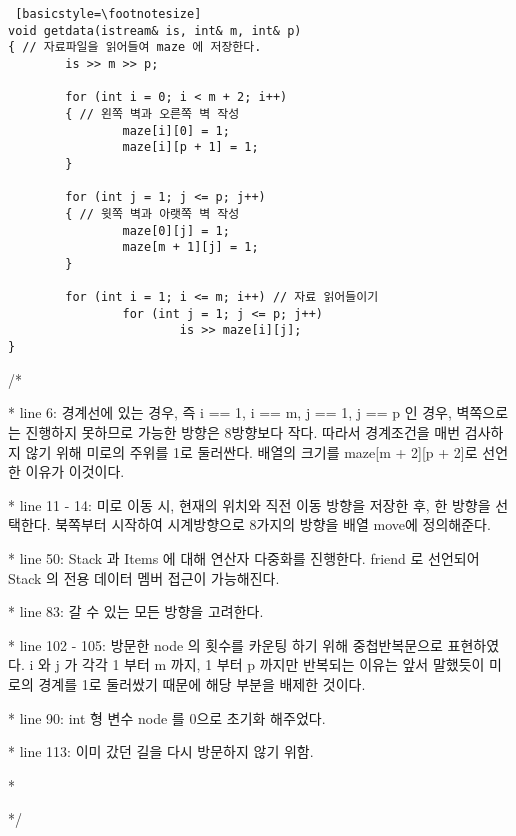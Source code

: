 \documentclass[twoside,twocolumn]{article}
\newenvironment{itemizeReduced}{
\begin{list}{\labelitemi}{\leftmargin=1em}
\setlength{\itemsep}{1pt}
\setlength{\parskip}{0pt}
\setlength{\parsep}{0pt}}{\end{list}
}
\begin{document}
\begin{lstlisting} [basicstyle=\footnotesize]
void getdata(istream& is, int& m, int& p)
{ // 자료파일을 읽어들여 maze 에 저장한다.
        is >> m >> p;

        for (int i = 0; i < m + 2; i++)
        { // 왼쪽 벽과 오른쪽 벽 작성
                maze[i][0] = 1;
                maze[i][p + 1] = 1;
        }

        for (int j = 1; j <= p; j++)
        { // 윗쪽 벽과 아랫쪽 벽 작성
                maze[0][j] = 1;
                maze[m + 1][j] = 1;
        }

        for (int i = 1; i <= m; i++) // 자료 읽어들이기
                for (int j = 1; j <= p; j++)
                        is >> maze[i][j];
}
\end{lstlisting}
\begin{itemizeReduced}
    \item[/*] 
    \item[*] line 6: 경계선에 있는 경우, 즉 i == 1, i == m, j == 1, j == p 인 경우, 벽쪽으로는 진행하지 못하므로 가능한 방향은 8방향보다 작다. 따라서 경계조건을 매번 검사하지 않기 위해 미로의 주위를 1로 둘러싼다. 배열의 크기를 maze[m + 2][p + 2]로 선언한 이유가 이것이다.
    \item[*] line 11 - 14: 미로 이동 시, 현재의 위치와 직전 이동 방향을 저장한 후, 한 방향을 선택한다. 북쪽부터 시작하여 시계방향으로 8가지의 방향을 배열 move에 정의해준다.
    \item[*] line 50: Stack 과 Items 에 대해 연산자 다중화를 진행한다. friend 로 선언되어 Stack 의 전용 데이터 멤버 접근이 가능해진다.
    \item[*] line 83: 갈 수 있는 모든 방향을 고려한다.
    \item[*] line 102 - 105: 방문한 node 의 횟수를 카운팅 하기 위해 중첩반복문으로 표현하였다. i 와 j 가 각각 1 부터 m 까지, 1 부터 p 까지만 반복되는 이유는 앞서 말했듯이 미로의 경계를 1로 둘러쌌기 때문에 해당 부분을 배제한 것이다.
    \item[*] line 90: int 형 변수 node 를 0으로 초기화 해주었다.
    \item[*] line 113: 이미 갔던 길을 다시 방문하지 않기 위함.
    \item[*] 
\end{itemizeReduced}
*/
\end{document}
